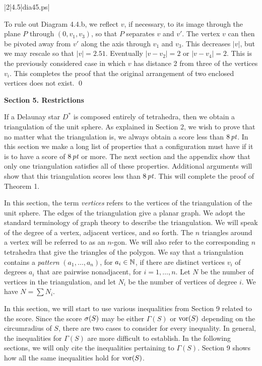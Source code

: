 \gram|2|4.5|dia45.ps|

To rule out Diagram 4.4.b, 
we reflect $v$, if necessary, to its image through the
plane $P$ through $(0,v_1,v_3)$, so that $P$
separates $v$ and $v'$.  The vertex $v$ can then be pivoted
away from $v'$ along the axis through $v_1$ and $v_3$.
This decreases $|v|$, but we may rescale so that $|v|=2.51$.
Eventually $|v-v_2|=2$ or $|v-v_4|=2$.  This is the
previously considered case in which $v$ has distance 2 from
three of the vertices $v_i$.
This completes the proof that the original arrangement of two enclosed
vertices does not exist. \qed


\bigskip
\centerline{\bf Section 5. Restrictions}
\bigskip

If a Delaunay star $D^*$ is composed entirely of tetrahedra, then
we obtain a triangulation of the unit sphere.  As explained in
Section 2, we wish to prove that no matter what the triangulation
is, we always obtain a score less than $8\,\hbox{\it pt}$.
In this section we make a long list of properties that a configuration
must have if it is to have a score of $8\,\hbox{\it pt}$ or more.  The next
section and the appendix show 
that only one triangulation satisfies all of these
properties.  Additional arguments will
show that this
triangulation scores less than $8\,\hbox{\it pt}$.  This will complete the
proof of Theorem 1.

In this section, the term {\it vertices\/} refers to the vertices of the
triangulation of the unit sphere.
The edges of the triangulation give a planar graph.
We adopt the standard terminology of graph theory to describe the
triangulation.  We will speak of the degree of a vertex, adjacent
vertices, and so forth.
The $n$ triangles around a vertex will be
referred to as an $n$-gon.  We will also refer to the corresponding
$n$ tetrahedra that give the triangles of the polygon.
We say that a triangulation contains
a {\it pattern\/} $(a_1,\ldots,a_n)$, for $a_i\in {\Bbb N}$, 
if there are distinct
vertices $v_i$ of degrees $a_i$ that are  pairwise nonadjacent, 
for $i=1,\ldots,n$. Let $N$ be the number of vertices in the
triangulation, and let $N_i$ be the number of vertices of degree $i$.
We have $N = \sum N_i$.

In this section, we will start to use various inequalities
from Section 9 related to the score.  Since the score $\sigma(S)$
may be either $\Gamma(S)$ or $\operatorname{vor}(S)$ depending on the
circumradius of $S$, there are two cases to consider for
every inequality.  In general, the inequalities for $\Gamma(S)$
are more difficult to establish.  In the following sections,
we will only cite the inequalities pertaining to $\Gamma(S)$.
Section 9 shows how all the same inequalities hold
for $\operatorname{vor}(S)$.

